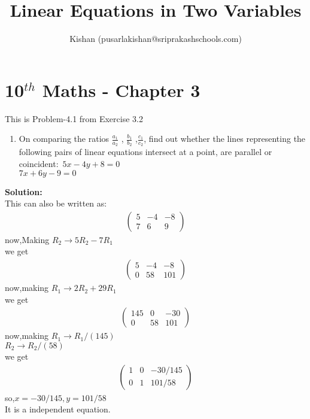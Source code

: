 \documentclass[10pt]{article}
\title{Linear Equations in Two Variables}
\author{Kishan (pusarlakishan@sriprakashschools.com)}
\newcommand{\myvec}[1]{\ensuremath{\begin{pmatrix}#1\end{pmatrix}}}
\newcommand{\solution}{\noindent \textbf{Solution: }}
\begin{document}
\maketitle
\section*{10$^{th}$ Maths - Chapter 3}
This is Problem-4.1 from Exercise 3.2
\begin{enumerate}
\item On comparing the ratios $\frac{a_1}{a_2}$ , $\frac{b_1}{b_2}$ ,$\frac{c_1}{c_2}$, find out whether the lines representing the following pairs of linear equations intersect at a point, are parallel or coincident:\
$5x-4y+8=0$\\ 
$7x+6y-9=0$\\
\end{enumerate}
\solution\\
This can also be written as:
\begin{align}
\myvec{5&-4&-8\\7&6&9}
\end{align}
now,Making $R_2 \xrightarrow\ 5R_2 - 7R_1$\\
we get
\begin{align}
\myvec{5&-4&-8\\0&58&101}
\end{align}
now,making $R_1 \xrightarrow\ 2R_2 + 29R_1$\\
we get
\begin{align}
\myvec{145&0&-30\\0&58&101}
\end{align}
now,making $R_1 \xrightarrow\ R_1/(145)$\\
$R_2 \xrightarrow\ R_2/(58)$\\
we get
\begin{align}
\myvec{1&0&-30/145\\0&1&101/58}
\end{align}
so,$x=-30/145,y=101/58$\\
It is a independent equation.
\end{document}
